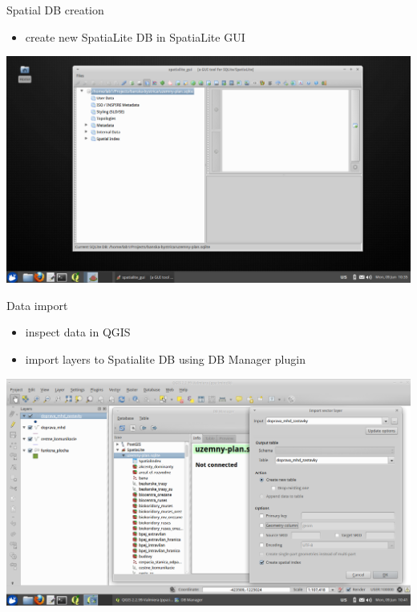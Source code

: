 \documentclass[12pt]{beamer}
\begin{document}
\begin{frame}{Spatial DB creation}
	\begin{itemize}
		\item create new SpatiaLite DB in SpatiaLite GUI
	\end{itemize}
	\begin{center}
		\includegraphics[keepaspectratio=true,height=0.7\textheight]{images/real-world-example/project-create-db.png}
	\end{center}
\end{frame}


\begin{frame}{Data import}
	\begin{itemize}
		\item inspect data in QGIS
		\item import layers to Spatialite DB using DB Manager plugin
	\end{itemize}
	\begin{center}
		\includegraphics[keepaspectratio=true,height=0.6\textheight]{images/real-world-example/project-db-import-layers.png}
	\end{center}
\end{frame}
\end{document}
